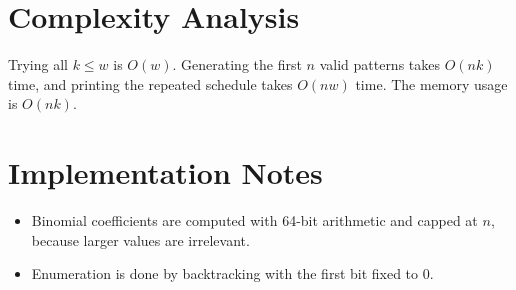 \documentclass[11pt]{article}
\begin{document}
\section*{Complexity Analysis}

Trying all $k \le w$ is $O(w)$. Generating the first $n$ valid patterns takes $O(nk)$ time, and printing
the repeated schedule takes $O(nw)$ time. The memory usage is $O(nk)$.

\section*{Implementation Notes}

\begin{itemize}[leftmargin=*]
    \item Binomial coefficients are computed with 64-bit arithmetic and capped at $n$, because larger
    values are irrelevant.
    \item Enumeration is done by backtracking with the first bit fixed to $0$.
\end{itemize}
\end{document}

